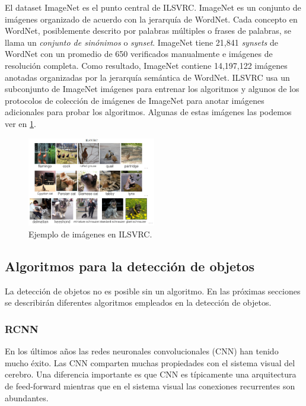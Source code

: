\documentclass{bmvc2k}
\begin{document}
El dataset ImageNet es el punto central de ILSVRC. ImageNet es un conjunto de imágenes
organizado de acuerdo con la jerarquía de WordNet. Cada concepto en WordNet, posiblemente descrito por palabras múltiples o frases de palabras, se llama un \textit{conjunto de sinónimos} o \textit{synset}. ImageNet tiene 21,841 \textit{synsets} de WordNet con un promedio de 650 verificados manualmente e imágenes de resolución completa. Como resultado, ImageNet contiene 14,197,122 imágenes anotadas organizadas por la jerarquía semántica de WordNet. ILSVRC usa un subconjunto de ImageNet imágenes para entrenar los algoritmos y algunos de los protocolos de colección de imágenes de ImageNet para anotar imágenes adicionales para probar los algoritmos. Algunas de estas imágenes las podemos ver en \ref{fig.ilsvrc}. \\

\begin{figure}
\begin{center}
	\includegraphics[width=0.5\textwidth]{images/ILSVRC.png}
   \caption{Ejemplo de imágenes en ILSVRC.}
	\label{fig.ilsvrc}
\end{center}
\end{figure}


\subsection{Algoritmos para la detección de objetos}

La detección de objetos no es posible sin un algoritmo. En las próximas secciones se describirán diferentes algoritmos empleados en la detección de objetos.\\

\subsubsection{RCNN}

En los últimos años las redes neuronales convolucionales (CNN) han tenido mucho éxito. Las CNN comparten muchas propiedades con el sistema visual del cerebro. Una diferencia importante es que CNN es típicamente una arquitectura de feed-forward mientras que en el sistema visual las conexiones recurrentes son abundantes. \\
\end{document}

